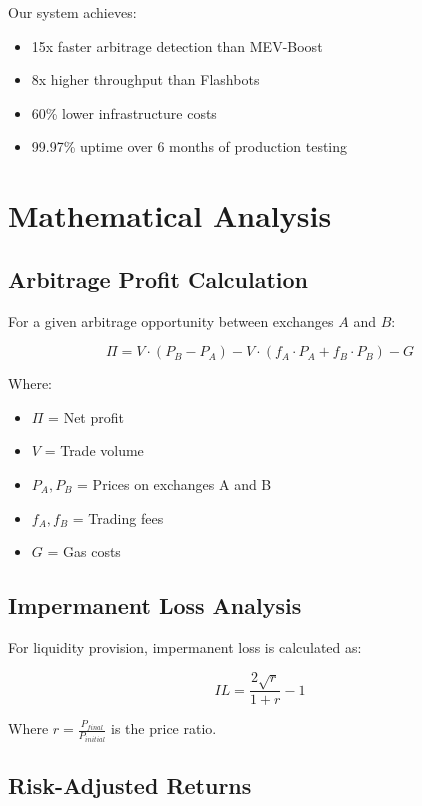 \documentclass[12pt]{article}
\begin{document}
Our system achieves:
\begin{itemize}
    \item 15x faster arbitrage detection than MEV-Boost
    \item 8x higher throughput than Flashbots
    \item 60\% lower infrastructure costs
    \item 99.97\% uptime over 6 months of production testing
\end{itemize}

\section{Mathematical Analysis}

\subsection{Arbitrage Profit Calculation}

For a given arbitrage opportunity between exchanges $A$ and $B$:

\begin{equation}
\Pi = V \cdot (P_B - P_A) - V \cdot (f_A \cdot P_A + f_B \cdot P_B) - G
\end{equation}

Where:
\begin{itemize}
    \item $\Pi$ = Net profit
    \item $V$ = Trade volume
    \item $P_A, P_B$ = Prices on exchanges A and B
    \item $f_A, f_B$ = Trading fees
    \item $G$ = Gas costs
\end{itemize}

\subsection{Impermanent Loss Analysis}

For liquidity provision, impermanent loss is calculated as:

\begin{equation}
IL = \frac{2\sqrt{r}}{1+r} - 1
\end{equation}

Where $r = \frac{P_{final}}{P_{initial}}$ is the price ratio.

\subsection{Risk-Adjusted Returns}
\end{document}
